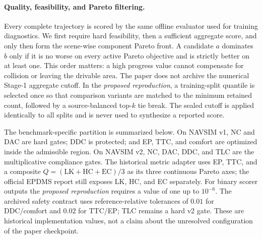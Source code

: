 

\paragraph{Quality, feasibility, and Pareto filtering.}
Every complete trajectory is scored by the same offline evaluator used for
training diagnostics.  We first require hard feasibility, then a sufficient
aggregate score, and only then form the scene-wise component Pareto front.  A
candidate $a$ dominates $b$ only if it is no worse on every active Pareto
objective and is strictly better on at least one.  This order matters: a high
progress value cannot compensate for collision or leaving the drivable area.
The paper does not archive the numerical Stage-1 aggregate cutoff.  In the
\emph{proposed reproduction}, a training-split quantile is selected once so
that comparison variants are matched to the minimum retained count, followed
by a source-balanced top-$k$ tie break.  The sealed cutoff is applied
identically to all splits and is never used to synthesize a reported score.

The benchmark-specific partition is summarized below.  On NAVSIM v1, NC and
DAC are hard gates; DDC is protected; and EP, TTC, and comfort are optimized
inside the admissible region.  On NAVSIM v2, NC, DAC, DDC, and TLC are the
multiplicative compliance gates.  The historical metric adapter uses EP, TTC,
and a composite $Q=(\mathrm{LK}+\mathrm{HC}+\mathrm{EC})/3$ as its three
continuous Pareto axes; the official EPDMS report still exposes LK, HC, and EC
separately.  For binary scorer outputs the \emph{proposed reproduction}
requires a value of one up to $10^{-6}$.  The archived safety contract uses
reference-relative tolerances of $0.01$ for DDC/comfort and $0.02$ for TTC/EP;
TLC remains a hard v2 gate.  These are historical implementation values, not a
claim about the unresolved configuration of the paper checkpoint.



